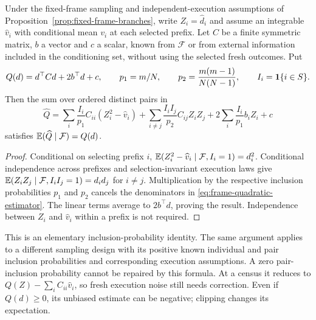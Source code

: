 \begin{proposition}
\label{prop:frame-quadratic}
Under the fixed-frame sampling and independent-execution assumptions of Proposition~\ref{prop:fixed-frame-branches}, write $Z_i=\widehat d_i$ and assume an integrable $\widehat v_i$ with conditional mean $v_i$ at each selected prefix. Let $C$ be a finite symmetric matrix, $b$ a vector and $c$ a scalar, known from $\mathcal F$ or from external information included in the conditioning set, without using the selected fresh outcomes. Put
\[
 Q(d)=d^\top Cd+2b^\top d+c,\qquad
 p_1=m/N,\qquad p_2=\frac{m(m-1)}{N(N-1)},\qquad I_i=\mathbf{1}\{i\in S\}.
\]
Then the sum over ordered distinct pairs in
\begin{equation}
 \widehat Q=
 \sum_i\frac{I_i}{p_1}C_{ii}(Z_i^2-\widehat v_i)
 +\sum_{i\ne j}\frac{I_iI_j}{p_2}C_{ij}Z_iZ_j
 +2\sum_i\frac{I_i}{p_1}b_iZ_i+c
 \label{eq:frame-quadratic-estimator}
\end{equation}
satisfies $\mathbb{E}(\widehat Q\mid\mathcal F)=Q(d)$.
\end{proposition}

\begin{proof}
Conditional on selecting prefix $i$, $\mathbb{E}(Z_i^2-\widehat v_i\mid\mathcal F,I_i=1)=d_i^2$. Conditional independence across prefixes and selection-invariant execution laws give $\mathbb{E}(Z_iZ_j\mid\mathcal F,I_iI_j=1)=d_id_j$ for $i\ne j$. Multiplication by the respective inclusion probabilities $p_1$ and $p_2$ cancels the denominators in \eqref{eq:frame-quadratic-estimator}. The linear terms average to $2b^\top d$, proving the result. Independence between $Z_i$ and $\widehat v_i$ within a prefix is not required.
\end{proof}

This is an elementary inclusion-probability identity. The same argument applies to a different sampling design with its positive known individual and pair inclusion probabilities and corresponding execution assumptions. A zero pair-inclusion probability cannot be repaired by this formula. At a census it reduces to $Q(Z)-\sum_iC_{ii}\widehat v_i$, so fresh execution noise still needs correction. Even if $Q(d)\ge0$, its unbiased estimate can be negative; clipping changes its expectation.

